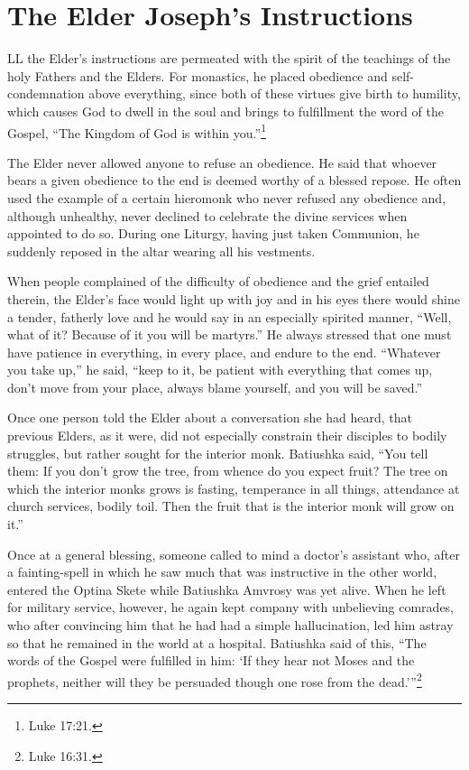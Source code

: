 \chapter {The Elder Joseph's Instructions}
LL the Elder's instructions are permeated with the spirit of the teachings of the holy Fathers and the Elders. For monastics, he placed obedience and self-condemnation above everything, since both of these virtues give birth to humility, which causes God to dwell in the soul and brings to fulfillment the word of the Gospel, ``The Kingdom of God is within you.''\footnote{Luke 17:21.}

The Elder never allowed anyone to refuse an obedience. He said that whoever bears a given obedience to the end is deemed worthy of a blessed repose. He often used the example of a certain hieromonk who never refused any obedience and, although unhealthy, never declined to celebrate the divine services when appointed to do so. During one Liturgy, having just taken Communion, he suddenly reposed in the altar wearing all his vestments.

When people complained of the difficulty of obedience and the grief entailed therein, the Elder's face would light up with joy and in his eyes there would shine a tender, fatherly love and he would say in an especially spirited manner, ``Well, what of it? Because of it you will be martyrs.'' He always stressed that one must have patience in everything, in every place, and endure to the end. ``Whatever you take up,'' he said, ``keep to it, be patient with everything that comes up, don't move from your place, always blame yourself, and you will be saved.''

Once one person told the Elder about a conversation she had heard, that previous Elders, as it were, did not especially constrain their disciples to bodily struggles, but rather sought for the interior monk. Batiushka said, ``You tell them: If you don't grow the tree, from whence do you expect fruit? The tree on which the interior monks grows is fasting, temperance in all things, attendance at church services, bodily toil. Then the fruit that is the interior monk will grow on it.''

Once at a general blessing, someone called to mind a doctor's assistant who, after a fainting-spell in which he saw much that was instructive in the other world, entered the Optina Skete while Batiushka Amvrosy was yet alive. When he left for military service, however, he again kept company with unbelieving comrades, who after convincing him that he had had a simple hallucination, led him astray so that he remained in the world at a hospital. Batiushka said of this, ``The words of the Gospel were fulfilled in him: `If they hear not Moses and the prophets, neither will they be persuaded though one rose from the dead.'''\footnote{Luke 16:31.}


